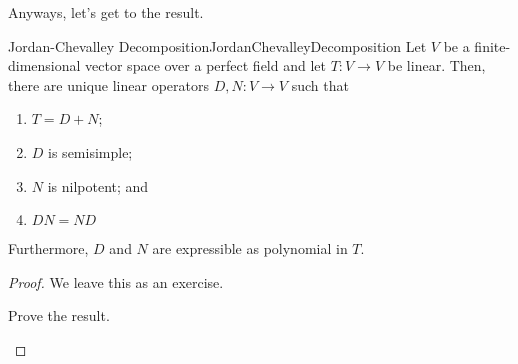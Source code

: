 Anyways, let's get to the result.
\begin{thm}{Jordan-Chevalley Decomposition}{JordanChevalleyDecomposition}
	Let $V$ be a finite-dimensional vector space over a perfect field and let $T\colon V\rightarrow V$ be linear.  Then, there are unique linear operators $D,N\colon V\rightarrow V$ such that
	\begin{enumerate}
		\item $T=D+N$;
		\item $D$ is semisimple;
		\item $N$ is nilpotent; and
		\item $DN=ND$
	\end{enumerate}
	Furthermore, $D$ and $N$ are expressible as polynomial in $T$.
	\begin{proof}
		We leave this as an exercise.
		\begin{exr}[breakable=false]{}{}
			Prove the result.
		\end{exr}
	\end{proof}
\end{thm}